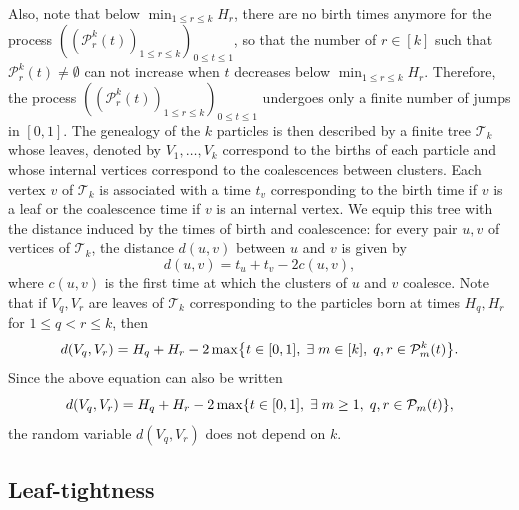 \documentclass[10pt]{amsart}
\theoremstyle{definition}\newtheorem{defi}[theo]{Definition}\newtheorem{rema}[theo]{Remark}\newtheorem{exam}[theo]{Example}\newtheorem{exem}[theo]{Example}\newtheorem{nota}[theo]{Notation}
\newcommand{\1}{\mathbbm{1}}
\newcommand{\Part}{\mathcal{P}}
\newcommand{\T}{\mathcal{T}}
\let\originalleft\left
\let\originalright\right
\renewcommand{\left}{\mathopen{}\mathclose\bgroup\originalleft}
\renewcommand{\right}{\aftergroup\egroup\originalright}
\let\oldexists\exists
\renewcommand*{\exists}{\mathrel{\oldexists}}
\begin{document}
Also, note that below $\min_{1 \le r \le k} H_r$, there are no birth times anymore for the process $((\Part_r^k(t))_{1\leq r \leq k})_{0\leq t\leq 1}$, so that the number of $r\in [k]$ such that $\Part^k_r(t) \neq \emptyset$ can not increase when $t$ decreases {below $\min_{1 \le r \le k} H_r$}. Therefore, the process $((\Part_r^k(t))_{1\leq r \leq k})_{0\leq t\leq 1}$ undergoes only a finite number of jumps in $[0,1]$. The genealogy of the $k$ particles is then described by a finite tree $\T_k$ whose leaves, denoted by $V_1,\dots,V_k$ correspond to the births of each particle and whose internal vertices correspond to the coalescences between clusters. Each vertex $v$ of $\T_k$ is associated with a time $t_v$ corresponding to the birth time if $v$ is a leaf or the coalescence time {if} $v$ is an internal vertex. We equip this tree with the distance induced by the times of birth and coalescence: for every pair $u,v$ of vertices of $\T_k$, the distance $d(u,v)$ between $u$ and $v$ is given by
\[
d(u,v) = t_u+t_v-2c(u,v),
\]
where $c(u,v)$ is the first time at which the clusters of $u$ and $v$ coalesce. Note that if $V_q,V_r$ are leaves of $\T_k$ corresponding to the particles born at times $H_q,H_r$ for $1 \le q<r\le k$, then
\begin{equation}\label{eq lien distance coalescent continu}
d(V_q,V_r)= H_q+H_r - 2\max \left\{t \in [0,1], \; \exists m\in [k], \; q,r \in \Part^k_m(t) \right\}.
\end{equation}
Since the above equation can also be written
\[
d(V_q,V_r)= H_q+H_r - 2\max \left\{t \in [0,1], \; \exists m\ge1, \; q,r \in  \Part_m(t) \right\},
\]
the random variable $d(V_q,V_r)$ does not depend on $k$.

\subsection{Leaf-tightness} \label{sec:continuum_leaf-tight}
\end{document}
